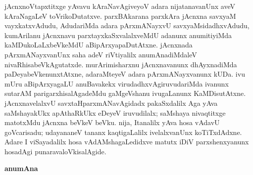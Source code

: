 jAcnxnoV\-tapxtitxge yAvavu kAraNavAgiveyoV adara nijatanavanUnx aveV kAraNagaLeV toVrikoDu\-tatxve. parxBAkarana parxkAra jAcnxna savxyaM vayxkatxvAdudu, AdudariMda adara pArxmANayxvU savxyaMsidadhxvAdudu, kumArilanu jAcnxnavu parxtayxkaSxvalalxveMdU adanunx anumiti\-yiMda kaMDukoLaLxbeVkeMdU aBipArxyapaDutAtxne. jAcnxnada pArxmANayxvanUnx saha adeV riVti\-yalilx anumAnadiMdaleV nivaRhisabeVkAgutatxde. murArimisharxnu jAcnxnavanunx dhAyxna\-diMda paDeyabeVkenunxtAtxne, adaraMteyeV adara pArxmANayxvanunx kUDa. ivu mUru aBipArxyagaLU anuBavakekx virudadhxvAgiruvudariMda ivanunx sutarAM parigarxhisa\-lAga\-deMdu gaMgeVshanu ivugaLanunx KaMDisutAtxne. jAcnxnavelalxvU savxtaHparxmANavAgidadx pakaSx\-dalilx Aga yAva saMshayakUkx apAthaRkUkx eDeyeV iruvudilalx; saMshaya nivaqtitxge matotxMdu jAcnxna beVkeV beVku. nija, Itanalilx yAva hosa vAdavU goVcarisadu; udayananeV tananx kaqtigaLalilx ivelalxvanUnx koTiTxdAdxne. Adare I viSayadalilx hosa vAdAMshagaLedidxve matutx iDiV parxshenxyanunx hosadAgi punaravaloVkisalAgide.

\newpage

\begin{center}
{\Large\bf anumAna}
\end{center}

